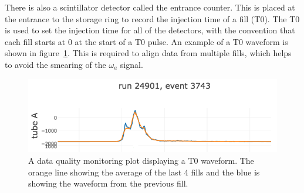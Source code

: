 There is also a scintillator detector called the entrance counter. This is placed at the entrance to the storage ring to record the injection time of a fill (T0). The T0 is used to set the injection time for all of the detectors, with the convention that each fill starts at 0 at the start of a T0 pulse. An example of a T0 waveform is shown in figure~\ref{fig:t0plot}. This is required to align data from multiple fills, which helps to avoid the smearing of the $\omega_{a}$ signal\cite{Reference22}.

\begin{figure}[th]
\centering
\includegraphics[scale=0.60]{Figures/t0plot.png}
\decoRule
\caption{A data quality monitoring plot displaying a T0 waveform. The orange line showing the average of the last 4 fills and the blue is showing the waveform from the previous fill.}
\label{fig:t0plot}
\end{figure}

